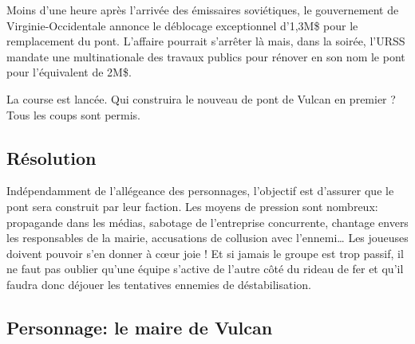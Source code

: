 Moins d'une heure après l'arrivée des émissaires soviétiques, le gouvernement de Virginie-Occidentale annonce le déblocage exceptionnel d'1,3M\$ pour le remplacement du pont.
L'affaire pourrait s'arrêter là mais, dans la soirée, l'URSS mandate une multinationale des travaux publics pour rénover en son nom le pont pour l'équivalent de 2M\$.

La course est lancée.
Qui construira le nouveau de pont de Vulcan en premier ?
Tous les coups sont permis.

\subsection{Résolution}

Indépendamment de l'allégeance des personnages, l'objectif est d'assurer que le pont sera construit par leur faction.
Les moyens de pression sont nombreux: propagande dans les médias, sabotage de l'entreprise concurrente, chantage envers les responsables de la mairie, accusations de collusion avec l'ennemi\dots
Les joueuses doivent pouvoir s'en donner à cœur joie ! Et si jamais le groupe est trop passif, il ne faut pas oublier qu'une équipe s'active de l'autre côté du rideau de fer et qu'il faudra donc déjouer les tentatives ennemies de déstabilisation.

\subsection*{Personnage: le maire de Vulcan}


